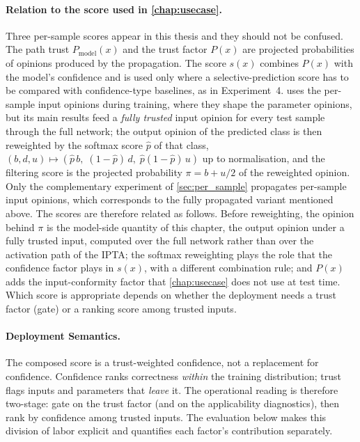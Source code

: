 \paragraph*{Relation to the score used in \cref{chap:usecase}.} Three per-sample scores appear in this thesis and they should not be confused. The path trust $P_{\mathrm{model}}(x)$ and the trust factor $P(x)$ are projected probabilities of opinions produced by the propagation. The score $s(x)$ combines $P(x)$ with the model's confidence and is used only where a selective-prediction score has to be compared with confidence-type baselines, as in Experiment~4.  uses the per-sample input opinions during training, where they shape the parameter opinions, but its main results feed a \emph{fully trusted} input opinion for every test sample through the full network; the output opinion of the predicted class is then reweighted by the softmax score $\hat{p}$ of that class, $(b, d, u) \mapsto (\hat{p}\, b,\; (1 - \hat{p})\, d,\; \hat{p}(1 - \hat{p})\, u)$ up to normalisation, and the filtering score is the projected probability $\pi = b + u/2$ of the reweighted opinion. Only the complementary experiment of \cref{sec:per_sample} propagates per-sample input opinions, which corresponds to the fully propagated variant mentioned above. The scores are therefore related as follows. Before reweighting, the opinion behind $\pi$ is the model-side quantity of this chapter, the output opinion under a fully trusted input, computed over the full network rather than over the activation path of the \ac{IPTA}; the softmax reweighting plays the role that the confidence factor plays in $s(x)$, with a different combination rule; and $P(x)$ adds the input-conformity factor that \cref{chap:usecase} does not use at test time. Which score is appropriate depends on whether the deployment needs a trust factor (gate) or a ranking score among trusted inputs.

\paragraph*{Deployment Semantics.}
The composed score is a trust-weighted confidence, not a replacement for confidence. Confidence ranks correctness \emph{within} the training distribution; trust flags inputs and parameters that \emph{leave} it. The operational reading is therefore two-stage: gate on the trust factor (and on the applicability diagnostics), then rank by confidence among trusted inputs. The evaluation below makes this division of labor explicit and quantifies each factor's contribution separately.

